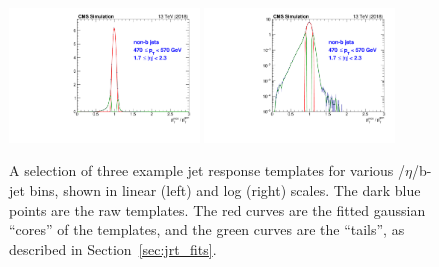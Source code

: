 \begin{figure}[htbp]
\begin{center}
    \includegraphics[width=0.45\textwidth]{figs/jetmet/pt10_eta06_nonbjets_lin.pdf}
    \includegraphics[width=0.45\textwidth]{figs/jetmet/pt10_eta06_nonbjets_log.pdf} \\
    \caption{A selection of three example jet response templates for various \pt/$\eta$/b-jet bins, shown in linear (left) and log (right) scales.
    The dark blue points are the raw templates. The red curves are the fitted gaussian ``cores'' of the templates, and the green
    curves are the ``tails'', as described in Section~\ref{sec:jrt_fits}.
           }
    \label{fig:jrt_examples}
  \end{center}
\end{figure}

